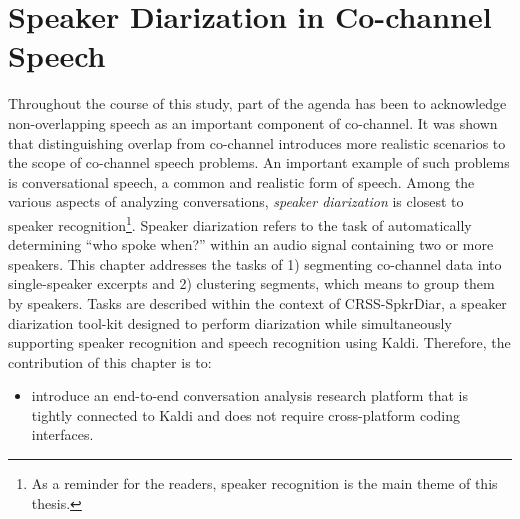 
\chapter{Speaker Diarization in Co-channel Speech}
\label{chap:spkr_diar}

Throughout the course of this study, part of the agenda has been to acknowledge non-overlapping speech as an important component of co-channel. 
It was shown that distinguishing overlap from co-channel introduces more realistic scenarios to the scope of co-channel speech problems. 
An important example of such problems is conversational speech, a common and realistic form of speech. 
Among the various aspects of analyzing conversations, {\it speaker diarization} is closest to speaker recognition\footnote{As a reminder for the readers, speaker recognition is the main theme of this thesis.}.
Speaker diarization refers to the task of automatically determining ``who spoke when?'' within an audio signal containing two or more speakers. 
This chapter addresses the tasks of 1) segmenting co-channel data into single-speaker excerpts and 2) clustering segments, which means to group them by speakers. 
Tasks are described within the context of CRSS-SpkrDiar, a speaker diarization tool-kit designed to perform diarization while simultaneously supporting speaker recognition and speech recognition using Kaldi\cite{kaldi}. 
Therefore, the contribution of this chapter is to: 
\begin{itemize}
	\item introduce an end-to-end conversation analysis research platform that is tightly connected to Kaldi and does not require cross-platform coding interfaces. 
\end{itemize}

